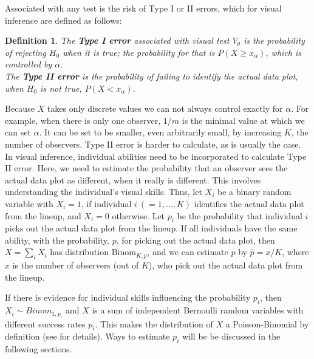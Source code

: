 \documentclass[12pt]{article}
\newcommand{\green}[1]{{\color{green} #1}} %
\newcommand{\hh}[1]{{\color{orange} #1}} %
\newtheorem{dfn}{Definition}[section]
\begin{document}
\noindent
Associated with any test is the risk of  Type I or II errors, which for visual inference are defined as follows: 

\begin{dfn}\label{dfn:error}
The \textbf{Type I error} associated with visual test $V_{\theta}$ is the probability of rejecting $H_0$ when it is true; the probability for that is $P(X \ge x_{\alpha})$, which is controlled by $\alpha$.\\ \noindent
The \textbf{Type II error} is the probability of failing to identify the actual data plot, when $H_0$ is not true, $P( X <  x_{\alpha})$.
\end{dfn}


\noindent Because $X$ takes only discrete values we can not always control exactly for $\alpha$. %
For example, when there is only one observer, $1/m$ is the minimal value at which we can set $\alpha$. It can be set to be smaller, even arbitrarily small, by increasing $K$, the number of observers. 
Type II error is harder to calculate, as is usually the case. In visual inference, individual abilities need to be incorporated to calculate Type II error. %
Here, we need to estimate the probability that an observer sees the actual data plot as different, when it really is different. This involves understanding the individual's visual skills. Thus, let $X_i$ be a binary random variable with $X_i = 1$, if individual $i \ (=1, \dots , K)$ identifies the actual data plot from the lineup, and $X_i = 0$ otherwise. Let $p_i$ be the probability that individual $i$ picks out the actual data plot from the lineup. If all individuals have the same ability, with the probability, $p$, for picking out the actual data plot, then $X = \sum_i X_i$ has distribution $\text{Binom}_{K, p}$, and we can estimate $p$ by $\hat{p} = x/K$, where $x$ is the number of observers (out of $K$), who pick out the actual data plot from the lineup. 


If there is evidence for individual skills influencing the probability $p_i$, then \green{$X_i \sim Binom_{1, p_i}$} and $X$ is a sum of independent Bernoulli random variables with different success rates $p_i$. This makes the distribution of $X$ a Poisson-Binomial by definition (see \citet{butler93} for details). \green{Ways to estimate $p_i$ will be be discussed in the following sections.}
\end{document}
